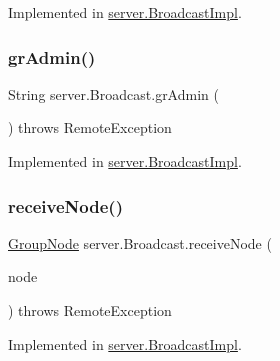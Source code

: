 Implemented in \hyperlink{classserver_1_1_broadcast_impl_aa6f1dcfe6e97de483e26a2c0a37688d3}{server.\+Broadcast\+Impl}.

\mbox{\label{interfaceserver_1_1_broadcast_ad17b53d0030a03ab8262ec9c94d19cdb}} 
\subsubsection{\texorpdfstring{gr\+Admin()}{grAdmin()}}
{\footnotesize\ttfamily String server.\+Broadcast.\+gr\+Admin (\begin{DoxyParamCaption}{ }\end{DoxyParamCaption}) throws Remote\+Exception}



Implemented in \hyperlink{classserver_1_1_broadcast_impl_ae5995f5346d95cdbcd02361f10158671}{server.\+Broadcast\+Impl}.

\mbox{\label{interfaceserver_1_1_broadcast_aac507ae95810ae722d7d204e5f0b5762}} 
\subsubsection{\texorpdfstring{receive\+Node()}{receiveNode()}}
{\footnotesize\ttfamily \hyperlink{classstructure_1_1_group_node}{Group\+Node} server.\+Broadcast.\+receive\+Node (\begin{DoxyParamCaption}\item[{\hyperlink{classstructure_1_1_group_node}{Group\+Node}}]{node }\end{DoxyParamCaption}) throws Remote\+Exception}



Implemented in \hyperlink{classserver_1_1_broadcast_impl_a15437fb9a1caea537b29d0ded4809e32}{server.\+Broadcast\+Impl}.

\mbox{\label{interfaceserver_1_1_broadcast_aaad069086f243e7b256e732a65f78763}} 
